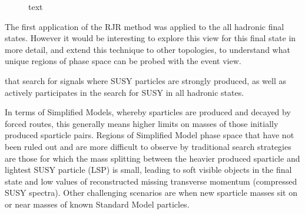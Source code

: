 \begin{figure}[tb]
\centering
{}
\caption{\label{fig:ICHEPLimits} text
}
\end{figure}




The first application of the RJR method was applied to the all hadronic final states. However it would be interesting to explore this view for this final state in more detail, and extend this technique to other topologies, to understand what unique regions of phase space can be probed with the event view.



 that search for signals
where SUSY particles are strongly produced, as well as actively
participates in the search for SUSY in all hadronic states.


In terms of Simplified Models, whereby sparticles are produced and decayed by forced routes, this generally means higher limits on masses of those initially produced sparticle pairs. Regions of Simplified Model phase space that have not been ruled out and are more difficult to observe by traditional search strategies are those for which the mass splitting between the heavier produced sparticle and lightest SUSY particle (LSP) is small, leading to soft visible objects in the final state and low values of reconstructed missing transverse momentum (compressed SUSY spectra). Other challenging scenarios are when new sparticle masses sit on or near masses of known Standard Model particles.


